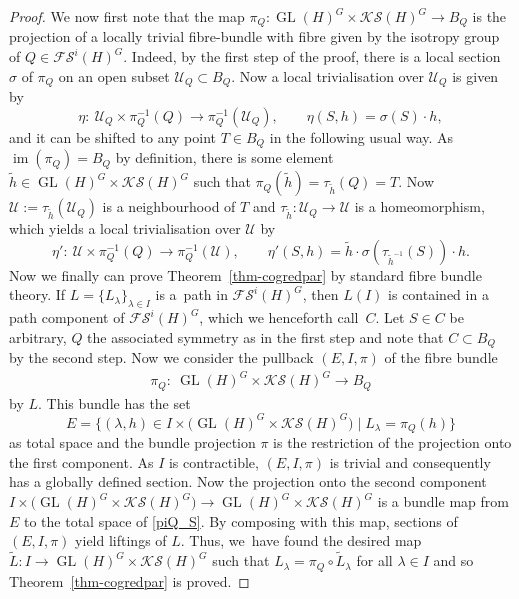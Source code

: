 \documentclass[10pt,a4paper]{amsart}
\DeclareMathOperator{\GL}{GL}
\DeclareMathOperator{\im}{im}
\begin{document}
\begin{proof}
We now first note that the map $\pi_Q \colon \GL(H)^G\times\mathcal{KS}(H)^G\rightarrow B_Q$ is the projection of a locally trivial fibre-bundle with fibre given by the isotropy group of $Q\in\mathcal{FS}^i(H)^G$. Indeed, by the first step of the proof, there is a local section $\sigma$ of $\pi_Q$ on an open subset $\mathcal{U}_Q\subset B_Q$. Now a local trivialisation over $\mathcal{U}_Q$ is given by
\[\eta \colon \ \mathcal{U}_Q\times\pi^{-1}_Q(Q)\rightarrow\pi^{-1}_Q(\mathcal{U}_Q),\qquad \eta(S,h)=\sigma(S)\cdot h,\]
and it can be shifted to any point $T\in B_Q$ in the following usual way. As $\im(\pi_Q)=B_Q$ by definition, there is some element $\tilde{h}\in \GL(H)^G\times\mathcal{KS}(H)^G$ such that $\pi_Q(\tilde{h})=\tau_{\tilde{h}}(Q)=T$. Now $\mathcal{U}:=\tau_{\tilde{h}}(\mathcal{U}_Q)$ is a neighbourhood of $T$ and $\tau_{\tilde{h}} \colon \mathcal{U}_Q\rightarrow\mathcal{U}$ is a homeomorphism, which yields a local trivialisation over $\mathcal{U}$ by
\[\eta' \colon \ \mathcal{U}\times\pi^{-1}_Q(Q)\rightarrow\pi^{-1}_Q(\mathcal{U}),\qquad \eta'(S,h)=\tilde{h}\cdot\sigma(\tau_{\tilde{h}^{-1}}(S))\cdot h.\]
Now we finally can prove Theorem~\ref{thm-cogredpar} by standard fibre bundle theory. If $L=\{L_\lambda\}_{\lambda\in I}$ is a~path in $\mathcal{FS}^i(H)^G$, then $L(I)$ is contained in a path component of $\mathcal{FS}^i(H)^G$, which we henceforth call~$C$. Let $S\in C$ be arbitrary, $Q$ the associated symmetry as in the first step and note that $C\subset B_{Q}$ by the second step. Now we consider the pullback $(E,I,\pi)$ of the fibre bundle
\begin{align}\label{piQ_S}
\pi_{Q} \colon \ \GL(H)^G\times\mathcal{KS}(H)^G\rightarrow B_{Q}
\end{align}
by $L$. This bundle has the set
\[E=\bigl\{(\lambda,h)\in I\times \bigl(\GL(H)^G\times\mathcal{KS}(H)^G\bigr) \mid L_\lambda=\pi_Q(h)\bigr\}\]
as total space and the bundle projection $\pi$ is the restriction of the projection onto the first component. As $I$ is contractible, $(E,I,\pi)$ is trivial and consequently has a globally defined section. Now the projection onto the second component $I\times\bigl(\GL(H)^G\times\mathcal{KS}(H)^G\bigr)\rightarrow\GL(H)^G\times\mathcal{KS}(H)^G$ is a bundle map from $E$ to the total space of \eqref{piQ_S}. By composing with this map, sections of $(E,I,\pi)$ yield liftings of $L$. Thus, we~have found the desired map $\tilde{L} \colon I\rightarrow\GL(H)^G\times\mathcal{KS}(H)^G$ such that $L_\lambda=\pi_Q\circ\tilde{L}_\lambda$ for all $\lambda\in I$ and so Theorem~\ref{thm-cogredpar} is proved.
\end{proof}
\end{document}
